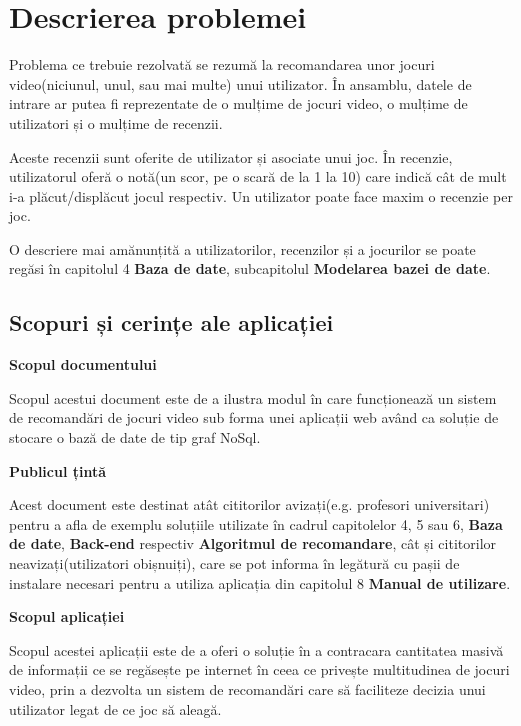 \documentclass[12pt,a4paper]{report}
\begin{document}
	
\newpage
	
\setcounter{secnumdepth}{3} 
\renewcommand*\thesection{\arabic{section}}
\section{Descrierea problemei}

Problema ce trebuie rezolvată se rezumă la recomandarea unor jocuri video(niciunul, unul, sau mai multe) unui utilizator. În ansamblu, datele de intrare ar putea fi reprezentate de o mulțime de jocuri video, o mulțime de utilizatori și o mulțime de recenzii.

Aceste recenzii sunt oferite de utilizator și asociate unui joc. În recenzie, utilizatorul oferă o notă(un scor, pe o scară de la 1 la 10) care indică cât de mult i-a plăcut/displăcut jocul respectiv. Un utilizator poate face maxim o recenzie per joc.

O descriere mai amănunțită a utilizatorilor, recenzilor și a jocurilor se poate regăsi în capitolul 4 \textbf{Baza de date}, subcapitolul \textbf{Modelarea bazei de date}.

\subsection{Scopuri și cerințe ale aplicației}

\bigskip
\bigskip
\textbf{Scopul documentului}
\bigskip

Scopul acestui document este de a ilustra modul în care funcționează un sistem de recomandări de jocuri video sub forma unei aplicații web având ca soluție de stocare o bază de date de tip graf NoSql.

\bigskip
\textbf{Publicul țintă}
\bigskip

Acest document este destinat atât cititorilor avizați(e.g. profesori universitari) pentru a afla de exemplu soluțiile utilizate în cadrul capitolelor 4, 5 sau 6, \textbf{Baza de date}, \textbf{Back-end} respectiv \textbf{Algoritmul de recomandare}, cât și cititorilor neavizați(utilizatori obișnuiți), care se pot informa în legătură cu pașii de instalare necesari pentru a utiliza aplicația din capitolul 8 \textbf{Manual de utilizare}.

\bigskip
\textbf{Scopul aplicației}
\bigskip

Scopul acestei aplicații este de a oferi o soluție în a contracara cantitatea masivă de informații ce se regăsește pe internet \cite{5} în ceea ce privește multitudinea de jocuri video, prin a dezvolta un sistem de recomandări care să faciliteze decizia unui utilizator legat de ce joc să aleagă.
\end{document}
